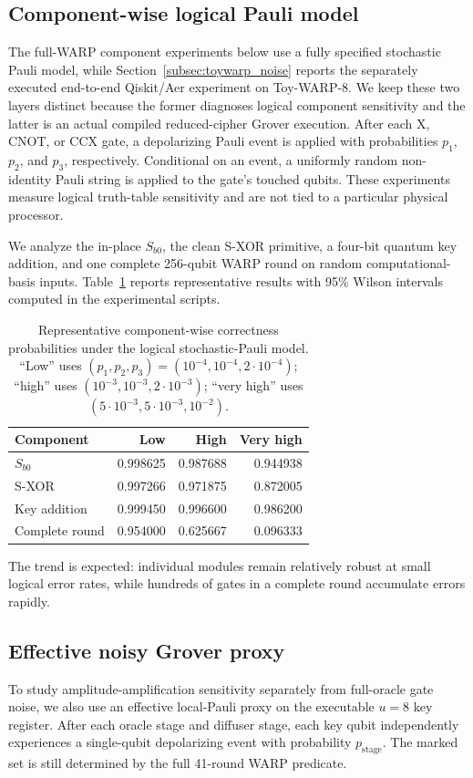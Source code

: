 \documentclass[10pt,a4paper]{article}
\begin{document}
\subsection{Component-wise logical Pauli model}
The full-WARP component experiments below use a fully specified stochastic Pauli model, while Section~\ref{subsec:toywarp_noise} reports the separately executed end-to-end Qiskit/Aer experiment on Toy-WARP-8. We keep these two layers distinct because the former diagnoses logical component sensitivity and the latter is an actual compiled reduced-cipher Grover execution. After each X, CNOT, or CCX gate, a depolarizing Pauli event is applied with probabilities $p_1$, $p_2$, and $p_3$, respectively. Conditional on an event, a uniformly random non-identity Pauli string is applied to the gate's touched qubits. These experiments measure logical truth-table sensitivity and are not tied to a particular physical processor.

We analyze the in-place $S_{b0}$, the clean S-XOR primitive, a four-bit quantum key addition, and one complete 256-qubit WARP round on random computational-basis inputs. Table~\ref{tab:component_noise} reports representative results with 95\% Wilson intervals computed in the experimental scripts.

\begin{table}[t]
\centering
\caption{Representative component-wise correctness probabilities under the logical stochastic-Pauli model. ``Low'' uses $(p_1,p_2,p_3)=(10^{-4},10^{-4},2\cdot10^{-4})$; ``high'' uses $(10^{-3},10^{-3},2\cdot10^{-3})$; ``very high'' uses $(5\cdot10^{-3},5\cdot10^{-3},10^{-2})$.}
\label{tab:component_noise}
\begin{tabular}{lrrr}
\toprule
Component & Low & High & Very high\\
\midrule
$S_{b0}$ & 0.998625 & 0.987688 & 0.944938\\
S-XOR & 0.997266 & 0.971875 & 0.872005\\
Key addition & 0.999450 & 0.996600 & 0.986200\\
Complete round & 0.954000 & 0.625667 & 0.096333\\
\bottomrule
\end{tabular}
\end{table}

The trend is expected: individual modules remain relatively robust at small logical error rates, while hundreds of gates in a complete round accumulate errors rapidly.

\subsection{Effective noisy Grover proxy}
To study amplitude-amplification sensitivity separately from full-oracle gate noise, we also use an effective local-Pauli proxy on the executable $u=8$ key register. After each oracle stage and diffuser stage, each key qubit independently experiences a single-qubit depolarizing event with probability $p_{\mathrm{stage}}$. The marked set is still determined by the full 41-round WARP predicate.
\end{document}
